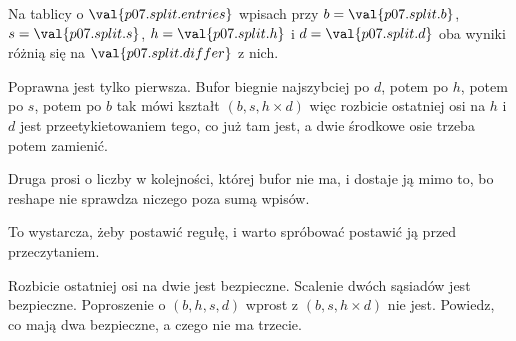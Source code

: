 \begin{fr}
Na tablicy o $\val{p07.split.entries}$ wpisach przy
$b = \val{p07.split.b}$, $s = \val{p07.split.s}$, $h = \val{p07.split.h}$ i
$d = \val{p07.split.d}$ oba wyniki różnią się na
$\val{p07.split.differ}$ z nich.

Poprawna jest tylko pierwsza. Bufor biegnie najszybciej po $d$, potem po $h$,
potem po $s$, potem po $b$ \dash{} tak mówi kształt $(b, s, h \times d)$ \dash{}
więc rozbicie ostatniej osi na $h$ i $d$ jest przeetykietowaniem tego, co już
tam jest, a dwie środkowe osie trzeba potem zamienić.

Druga prosi o liczby w kolejności, której bufor nie ma, i dostaje ją mimo to,
bo reshape nie sprawdza niczego poza sumą wpisów.
\end{fr}


\begin{fr}
To wystarcza, żeby postawić regułę, i warto spróbować postawić ją przed
przeczytaniem.

Rozbicie ostatniej osi na dwie jest bezpieczne. Scalenie dwóch sąsiadów jest
bezpieczne. Poproszenie o $(b, h, s, d)$ wprost z $(b, s, h \times d)$ nie jest.
Powiedz, co mają dwa bezpieczne, a czego nie ma trzecie.
\dotline
\nextframe
\end{fr}

